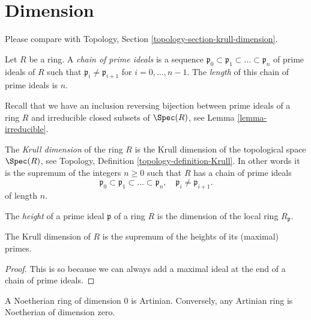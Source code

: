 \section{Dimension}
\label{section-dimension}

\noindent
Please compare with
Topology, Section \ref{topology-section-krull-dimension}.

\begin{definition}
\label{definition-chain-primes}
Let $R$ be a ring. A {\it chain of prime ideals} is a sequence
$\mathfrak p_0 \subset \mathfrak p_1 \subset \ldots \subset \mathfrak p_n$
of prime ideals of $R$ such that $\mathfrak p_i \not = \mathfrak p_{i + 1}$
for $i = 0, \ldots, n - 1$. The {\it length} of this chain of prime
ideals is $n$.
\end{definition}

\noindent
Recall that we have an inclusion reversing bijection between prime
ideals of a ring $R$ and irreducible closed subsets of $\Spec(R)$,
see Lemma \ref{lemma-irreducible}.

\begin{definition}
\label{definition-Krull}
The {\it Krull dimension} of the ring $R$ is the
Krull dimension of the topological space $\Spec(R)$, see
Topology, Definition \ref{topology-definition-Krull}.
In other words it is the supremum of the integers $n\geq 0$
such that $R$ has a chain of prime ideals
$$
\mathfrak p_0
\subset
\mathfrak p_1
\subset
\ldots
\subset
\mathfrak p_n, \quad
\mathfrak p_i \not = \mathfrak p_{i + 1}.
$$
of length $n$.
\end{definition}

\begin{definition}
\label{definition-height}
The {\it height} of a prime ideal $\mathfrak p$ of
a ring $R$ is the dimension of the local ring $R_{\mathfrak p}$.
\end{definition}

\begin{lemma}
\label{lemma-dimension-height}
The Krull dimension of $R$ is the supremum of the
heights of its (maximal) primes.
\end{lemma}

\begin{proof}
This is so because we can always add a maximal ideal at the end of a chain
of prime ideals.
\end{proof}

\begin{lemma}
\label{lemma-Noetherian-dimension-0}
A Noetherian ring of dimension $0$ is Artinian.
Conversely, any Artinian ring is Noetherian of dimension zero.
\end{lemma}

